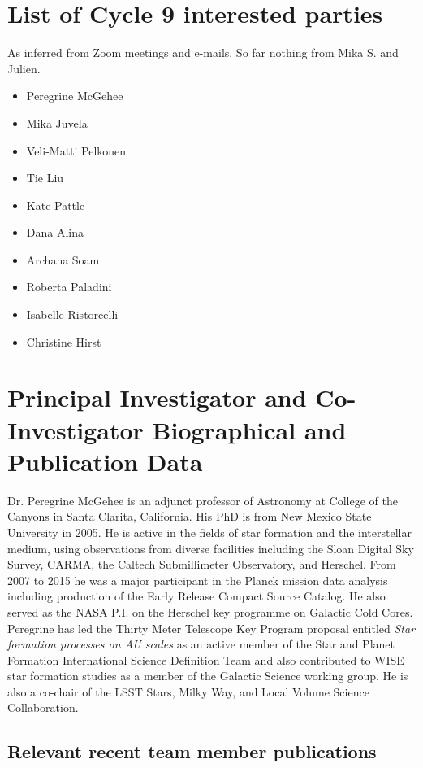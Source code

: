 \documentclass[11pt]{amsart}
\begin{document}
\section{List of Cycle 9 interested parties}

As inferred from Zoom meetings and e-mails. So far nothing from Mika S. and Julien.

\begin{itemize}
\item Peregrine McGehee
\item Mika Juvela
\item Veli-Matti Pelkonen
\item Tie Liu
\item Kate Pattle
\item Dana Alina
\item Archana Soam
\item Roberta Paladini
\item Isabelle Ristorcelli
\item Christine Hirst
\end{itemize}


\section{Principal Investigator and Co-Investigator Biographical and
Publication Data}

Dr. Peregrine McGehee is an adjunct professor of Astronomy at College of the Canyons in Santa Clarita, California. His PhD is from New Mexico State University in 2005. He is active
in the fields of star formation and the interstellar medium, using observations from diverse facilities including the Sloan Digital Sky Survey, CARMA, 
the Caltech Submillimeter Observatory, and Herschel.
From 2007 to 2015 he was a major participant in the Planck mission data analysis including production of the Early Release Compact Source Catalog. 
He also served as the NASA P.I. on the Herschel key programme on Galactic Cold Cores.   
Peregrine has led the Thirty Meter Telescope Key Program proposal entitled {\it Star formation processes on AU scales} as an active member of the Star and Planet Formation International Science Definition Team and also contributed to WISE star formation studies as a member of the Galactic Science working group.
He is also a co-chair of the LSST Stars, Milky Way, and Local Volume Science Collaboration.

\subsection{Relevant recent team member publications} 
\end{document}
